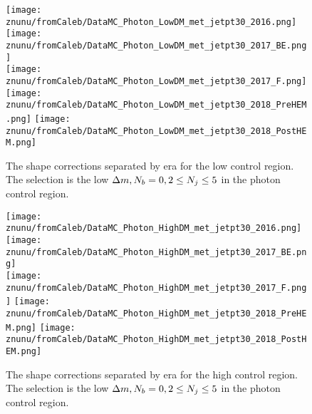 \begin{figure}[!h]
	\begin{center}
  \texttt{[image: znunu/fromCaleb/DataMC\_Photon\_LowDM\_met\_jetpt30\_2016.png]}
  \texttt{[image: znunu/fromCaleb/DataMC\_Photon\_LowDM\_met\_jetpt30\_2017\_BE.png]} \\
  \texttt{[image: znunu/fromCaleb/DataMC\_Photon\_LowDM\_met\_jetpt30\_2017\_F.png]}
  \texttt{[image: znunu/fromCaleb/DataMC\_Photon\_LowDM\_met\_jetpt30\_2018\_PreHEM.png]}
  \texttt{[image: znunu/fromCaleb/DataMC\_Photon\_LowDM\_met\_jetpt30\_2018\_PostHEM.png]}
	\end{center}
	\caption[\Znunu{} Shape by Era]{The \Znunu{} shape corrections separated by era for the low \dm{} control region. The selection is the low $\Delta m, N_{b}=0, 2\leq N_{j}\leq5$ in the photon control region.
	 }
	\label{fig:znunu-shape-lm-photon}
\end{figure}

\begin{figure}[!h]
	\begin{center}
  \texttt{[image: znunu/fromCaleb/DataMC\_Photon\_HighDM\_met\_jetpt30\_2016.png]}
  \texttt{[image: znunu/fromCaleb/DataMC\_Photon\_HighDM\_met\_jetpt30\_2017\_BE.png]} \\
  \texttt{[image: znunu/fromCaleb/DataMC\_Photon\_HighDM\_met\_jetpt30\_2017\_F.png]}
  \texttt{[image: znunu/fromCaleb/DataMC\_Photon\_HighDM\_met\_jetpt30\_2018\_PreHEM.png]}
  \texttt{[image: znunu/fromCaleb/DataMC\_Photon\_HighDM\_met\_jetpt30\_2018\_PostHEM.png]}
	\end{center}
	\caption[\Znunu{} Shape by Era]{The \Znunu{} shape corrections separated by era for the high \dm{} control region. The selection is the low $\Delta m, N_{b}=0, 2\leq N_{j}\leq5$ in the photon control region.
	 }
	\label{fig:znunu-shape-hm-photon}
\end{figure}
